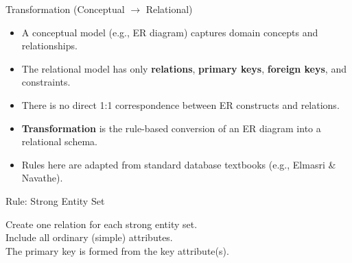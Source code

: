 \documentclass[10pt,aspectratio=169]{beamer}
\newcommand{\keyattr}[1]{\underline{#1}}
\begin{document}
\begin{frame}{Transformation (Conceptual $\rightarrow$ Relational)}
\small
\begin{itemize}
  \item A conceptual model (e.g., ER diagram) captures domain concepts and relationships.
  \item The relational model has only \textbf{relations}, \textbf{primary keys}, \textbf{foreign keys}, and constraints.
  \item There is no direct 1:1 correspondence between ER constructs and relations.
  \item \textbf{Transformation} is the rule-based conversion of an ER diagram into a relational schema.
  \item Rules here are adapted from standard database textbooks (e.g., Elmasri \& Navathe).
\end{itemize}
\end{frame}

\begin{frame}{Rule: Strong Entity Set}
\small

Create one relation for each strong entity set.\\
Include all ordinary (simple) attributes.\\
The primary key is formed from the key attribute(s).

\centering
{}
\end{frame}
\end{document}
